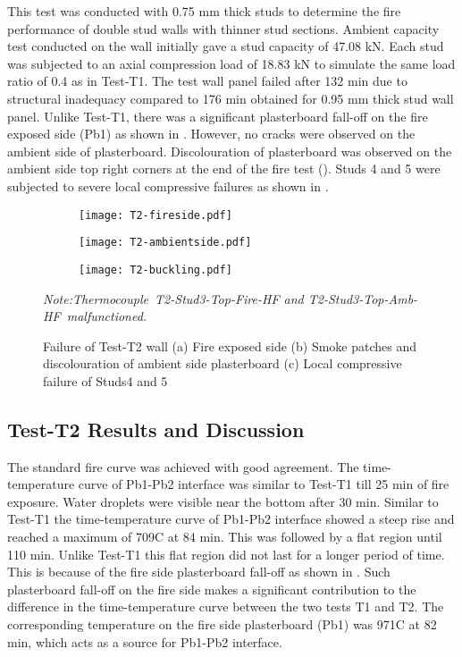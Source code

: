 This test was conducted with 0.75 mm thick studs to determine the fire performance of double stud walls with thinner stud sections. Ambient capacity test conducted on the wall initially gave a stud capacity of 47.08 kN. Each stud was subjected to an axial compression load of 18.83 kN to simulate the same load ratio of 0.4 as in Test-T1. The test wall panel failed after 132 min due to structural inadequacy compared to 176 min obtained for 0.95 mm thick stud wall panel. Unlike Test-T1, there was a significant plasterboard fall-off on the fire exposed side (Pb1) as shown in . However, no cracks were observed on the ambient side of plasterboard. Discolouration of plasterboard was observed on the ambient side top right corners at the end of the fire test (). Studs 4 and 5 were subjected to severe local compressive failures as shown in .
\begin{figure}[!htbp]
	\centering
	\begin{subfigure}[b]{0.3\textwidth}
		\centering
		\texttt{[image: T2-fireside.pdf]}
		\caption{}
		\label{subfig:T2-fireside}
	\end{subfigure}
	\begin{subfigure}[b]{0.3\textwidth}
		\centering
		\texttt{[image: T2-ambientside.pdf]}
		\caption{}
		\label{subfig:T2-ambientside}
	\end{subfigure}
	\begin{subfigure}[b]{0.3\textwidth}
		\centering
		\texttt{[image: T2-buckling.pdf]}
		\caption{}
		\label{subfig:T2-buckling}
	\end{subfigure}
	   \caption{Failure of Test-T2 wall (a) Fire exposed side (b) Smoke patches and discolouration of ambient side plasterboard (c) Local compressive failure of Studs4 and 5}
	   \label{fig:T2-failure}
	   \fontsize{10}{1}\textit{Note:Thermocouple T2-Stud3-Top-Fire-HF and T2-Stud3-Top-Amb-HF malfunctioned.}
\end{figure}

\subsection{Test-T2 Results and Discussion}\label{sec:t2-results}

The standard fire curve was achieved with good agreement. The time-temperature curve of Pb1-Pb2 interface was similar to Test-T1 till 25 min of fire exposure. Water droplets were visible near the bottom after 30 min. Similar to Test-T1 the time-temperature curve of Pb1-Pb2 interface showed a steep rise and reached a maximum of 709\degree C at 84 min. This was followed by a flat region until 110 min. Unlike Test-T1 this flat region did not last for a longer period of time. This is because of the fire side plasterboard fall-off as shown in . Such plasterboard fall-off on the fire side makes a significant contribution to the difference in the time-temperature curve between the two tests T1 and T2. The corresponding temperature on the fire side plasterboard (Pb1) was 971\degree C at 82 min, which acts as a source for Pb1-Pb2 interface.

